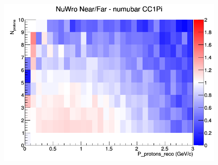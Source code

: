 \begin{figure}[h]
\endminipage
{}
\includegraphics[width=\linewidth]{eff_N_P/LAr/protons/ratios/CC1Pi_NuWro_numubar_NF_N_P.png}
\endminipage
\newline
\end{figure}
\clearpage
